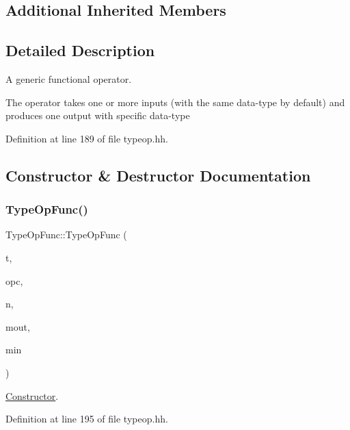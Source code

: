 \subsection*{Additional Inherited Members}


\subsection{Detailed Description}
A generic functional operator. 

The operator takes one or more inputs (with the same data-\/type by default) and produces one output with specific data-\/type 

Definition at line 189 of file typeop.\+hh.



\subsection{Constructor \& Destructor Documentation}
\mbox{\label{class_type_op_func_a2b4e7d7a31d4ce3d36c8753dbda577d1}} 
\subsubsection{\texorpdfstring{TypeOpFunc()}{TypeOpFunc()}}
{\footnotesize\ttfamily Type\+Op\+Func\+::\+Type\+Op\+Func (\begin{DoxyParamCaption}\item[{\mbox{\hyperlink{class_type_factory}{Type\+Factory}} $\ast$}]{t,  }\item[{\mbox{\hyperlink{opcodes_8hh_abeb7dfb0e9e2b3114e240a405d046ea7}{Op\+Code}}}]{opc,  }\item[{const string \&}]{n,  }\item[{\mbox{\hyperlink{type_8hh_aef6429f2523cdf4d415ba04a0209e61f}{type\+\_\+metatype}}}]{mout,  }\item[{\mbox{\hyperlink{type_8hh_aef6429f2523cdf4d415ba04a0209e61f}{type\+\_\+metatype}}}]{min }\end{DoxyParamCaption})\hspace{0.3cm}{\ttfamily [inline]}}



\mbox{\hyperlink{class_constructor}{Constructor}}. 



Definition at line 195 of file typeop.\+hh.



